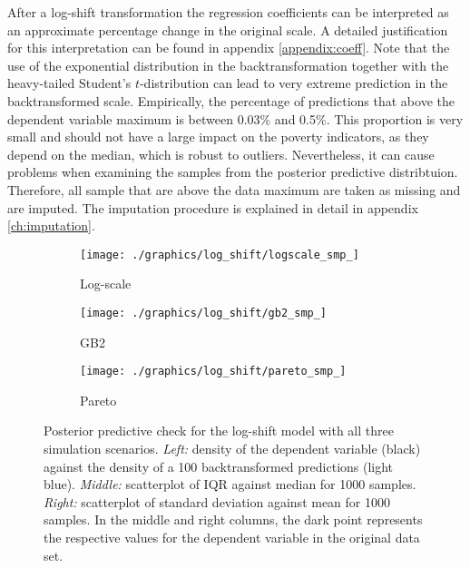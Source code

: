 After a log-shift transformation the regression coefficients can be interpreted as an approximate percentage change in the original scale.
A detailed justification for this interpretation can be found in appendix \ref{appendix:coeff}.
Note that the use of the exponential distribution in the backtransformation together with the heavy-tailed Student's $t$-distribution can lead to very extreme prediction in the backtransformed scale.
Empirically, the percentage of predictions that above the dependent variable maximum is between 0.03\% and 0.5\%.
This proportion is very small and should not have a large impact on the poverty indicators, as they depend on the median, which is robust to outliers.
Nevertheless, it can cause problems when examining the samples from the posterior predictive distribtuion.
Therefore, all sample that are above the data maximum are taken as missing and are imputed.
The imputation procedure is explained in detail in appendix \ref{ch:imputation}.

\begin{figure}
    \begin{subfigure}{\textwidth}
        \texttt{[image: ./graphics/log\_shift/logscale\_smp\_]}
        \caption{Log-scale}
    \end{subfigure}
    \newline
    \begin{subfigure}{\textwidth}
        \texttt{[image: ./graphics/log\_shift/gb2\_smp\_]}
        \caption{GB2}
    \end{subfigure}
    \newline
    \begin{subfigure}{\textwidth}
        \texttt{[image: ./graphics/log\_shift/pareto\_smp\_]}
        \caption{Pareto}
    \end{subfigure}
    \caption[Posterior predictive check for the log-shift model with all three simulation scenarios.]{Posterior predictive check for the log-shift model with all three simulation scenarios. \textit{Left:} density of the dependent variable (black) against the  density of a 100 backtransformed predictions (light blue). \textit{Middle:} scatterplot of IQR against median for 1000 samples. \textit{Right:} scatterplot of standard deviation against mean for 1000 samples. In the middle and right columns, the dark point represents the respective values for the dependent variable in the original data set.}
    \label{fig:ppc_logshift}
\end{figure}

